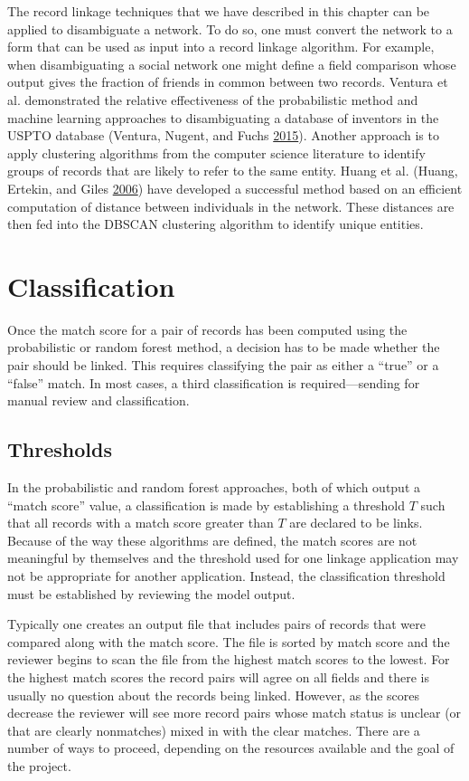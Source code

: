 \documentclass[]{krantz}
\begin{document}
The record linkage techniques that we have described in this chapter can
be applied to disambiguate a network. To do so, one must convert the
network to a form that can be used as input into a record linkage
algorithm. For example, when disambiguating a social network one might
define a field comparison whose output gives the fraction of friends in
common between two records. Ventura et al. demonstrated the relative
effectiveness of the probabilistic method and machine learning
approaches to disambiguating a database of inventors in the USPTO
database (Ventura, Nugent, and Fuchs
\protect\hyperlink{ref-ventura2015seeing}{2015}). Another approach is to
apply clustering algorithms from the computer science literature to
identify groups of records that are likely to refer to the same entity.
Huang et al. (Huang, Ertekin, and Giles
\protect\hyperlink{ref-HEG06}{2006}) have developed a successful method
based on an efficient computation of distance between individuals in the
network. These distances are then fed into the DBSCAN clustering
algorithm to identify unique entities.

\section{Classification}\label{classification}

Once the match score for a pair of records has been computed using the
probabilistic or random forest method, a decision has to be made whether
the pair should be linked. This requires classifying the pair as either
a ``true'' or a ``false'' match. In most cases, a third classification
is required---sending for manual review and classification.

\subsection{Thresholds}\label{S:thresholds}

In the probabilistic and random forest approaches, both of which output
a ``match score'' value, a classification is made by establishing a
threshold \(T\) such that all records with a match score greater than
\(T\) are declared to be links. Because of the way these algorithms are
defined, the match scores are not meaningful by themselves and the
threshold used for one linkage application may not be appropriate for
another application. Instead, the classification threshold must be
established by reviewing the model output.

Typically one creates an output file that includes pairs of records that
were compared along with the match score. The file is sorted by match
score and the reviewer begins to scan the file from the highest match
scores to the lowest. For the highest match scores the record pairs will
agree on all fields and there is usually no question about the records
being linked. However, as the scores decrease the reviewer will see more
record pairs whose match status is unclear (or that are clearly
nonmatches) mixed in with the clear matches. There are a number of ways
to proceed, depending on the resources available and the goal of the
project.
\end{document}
